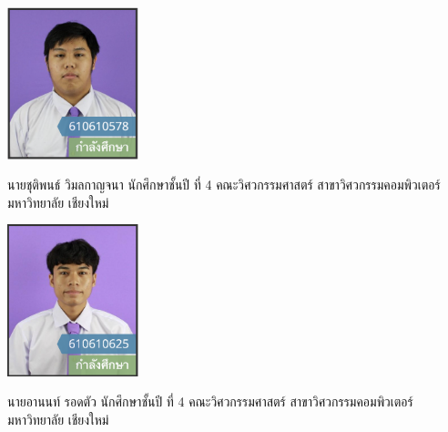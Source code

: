\documentclass[final]{cpecmu}
\author{นายชุติพนธ์ วิมลกาญจนา}{Chutipon Vimonkanjana}{610610578}
\author{นายอานนท์ รอดตัว}{Arnon Rottua}{610610625}
\begin{document}


\pagestyle{empty}\cleardoublepage
\normalspacing \setcounter{page}{1}  \pagestyle{cpecmu}





\ifproject

\fi



\ifproject
\normalspacing
\appendix
% 

\ifglossary\glossarypage\fi

\ifindex\indexpage\fi

\begin{biosketch}
\begin{center}
  \includegraphics[width=1.5in]{hok.png}
\end{center}
นายชุติพนธ์ วิมลกาญจนา นักศึกษาชั้นปี ที่ 4 คณะวิศวกรรมศาสตร์ สาขาวิศวกรรมคอมพิวเตอร์ มหาวิทยาลัย
เชียงใหม่
\end{biosketch}

\begin{biosketch}
  \begin{center}
    \includegraphics[width=1.5in]{toon.png}
  \end{center}
  นายอานนท์ รอดตัว นักศึกษาชั้นปี ที่ 4 คณะวิศวกรรมศาสตร์ สาขาวิศวกรรมคอมพิวเตอร์ มหาวิทยาลัย
  เชียงใหม่
  \end{biosketch}
  

\fi %
\end{document}
